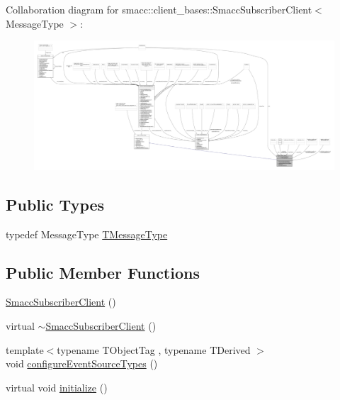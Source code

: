 Collaboration diagram for smacc\+:\+:client\+\_\+bases\+:\+:Smacc\+Subscriber\+Client$<$ Message\+Type $>$\+:
\nopagebreak
\begin{figure}[H]
\begin{center}
\leavevmode
\includegraphics[width=350pt]{classsmacc_1_1client__bases_1_1SmaccSubscriberClient__coll__graph}
\end{center}
\end{figure}
\subsection*{Public Types}
\begin{DoxyCompactItemize}
\item 
typedef Message\+Type \hyperlink{classsmacc_1_1client__bases_1_1SmaccSubscriberClient_a61d798bda71bf335d72e61928ca561b0}{T\+Message\+Type}
\end{DoxyCompactItemize}
\subsection*{Public Member Functions}
\begin{DoxyCompactItemize}
\item 
\hyperlink{classsmacc_1_1client__bases_1_1SmaccSubscriberClient_a9c3dd9981beb495a0646667acae06d73}{Smacc\+Subscriber\+Client} ()
\item 
virtual \hyperlink{classsmacc_1_1client__bases_1_1SmaccSubscriberClient_a91b9206c97b4acc76d4202639d24a53b}{$\sim$\+Smacc\+Subscriber\+Client} ()
\item 
{\footnotesize template$<$typename T\+Object\+Tag , typename T\+Derived $>$ }\\void \hyperlink{classsmacc_1_1client__bases_1_1SmaccSubscriberClient_adf0e61d4a0b34ecc76fb9f4c3d04ef97}{configure\+Event\+Source\+Types} ()
\item 
virtual void \hyperlink{classsmacc_1_1client__bases_1_1SmaccSubscriberClient_af188f0f5e89de26a07e1f964cdd23a70}{initialize} ()
\end{DoxyCompactItemize}
